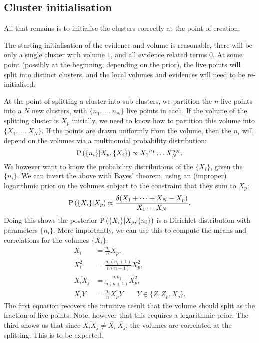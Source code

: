 \subsection{Cluster initialisation}
\label{sec:ens:cluster_init}
All that remains is to initialise the clusters correctly at the point of creation.

The starting initialisation of the evidence and volume is reasonable, there will be only a single cluster with volume \(1\), and all evidence related terms \(0\). At some point (possibly at the beginning, depending on the prior), the live points will split into distinct clusters, and the local volumes and evidences will need to be re-initialised.

At the point of splitting a cluster into sub-clusters, we partition the \(n\) live points into a \(N\) new clusters, with \(\{n_1,\ldots,n_N\}\) live points in each. If the volume of the splitting cluster is \(X_p\) initially, we need to know how to partition this volume into \(\{X_1,\ldots,X_N\}\). If the points are drawn uniformly from the volume, then the \(n_i\) will depend on the volumes via a multinomial probability distribution:
%
\begin{equation}
    \mathrm{P}\left(\{n_i\}\middle|X_p,\{X_i\}\right) \propto {X_1}^{n_1} \ldots X_N^{n_N}.
\end{equation}
%
We however want to know the probability distributions of the \(\{X_i\}\), given the \(\{n_i\}\). We can invert the above with Bayes' theorem, using an (improper) logarithmic prior on the volumes subject to the constraint that they sum to \(X_p\):
%
\begin{equation}
    \mathrm{P}\left(\{X_i\}\middle|X_p\right) \propto \frac{\delta(X_1+\cdots+X_N-X_p)}{X_1\cdots X_N}.
\end{equation}
%
Doing this shows the posterior \(\mathrm{P}\left(\{X_i\}\middle|X_p,\{n_i\}\right)\) is a Dirichlet distribution with parameters \(\{n_i\}\). More importantly, we can use this to compute the means and correlations for the volumes \(\{X_i\}\):
%
\begin{align}
  \overline{X_i}&=  \frac{n_i}{n} \overline X_p, \\
  \overline{X_i^2}&= \frac{n_i(n_i+1)}{n(n+1)} \overline{X_p^2}, \\
  \overline{X_i X_j} &= \frac{n_i n_j}{n(n+1)} \overline{X_p^2}, \\
  \overline{X_i Y} &= \frac{n_i}{n} \overline{X_p Y} \qquad Y\in \{Z,Z_p,X_q\}.
\end{align}
%
The first equation recovers the intuitive result that the volume should split as the fraction of live points. Note, however that this requires a logarithmic prior. The third shows us that since \(\overline{X_i X_j}\ne\overline{X_i}\:\overline{X_j}\), the volumes are correlated at the splitting. This is to be expected.

